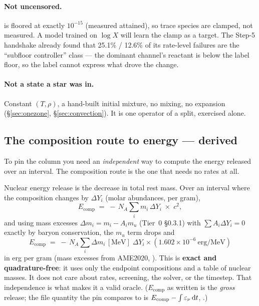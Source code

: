 \paragraph{Not uncensored.}  is floored at exactly $10^{-15}$
(measured attained), so trace species are clamped, not measured. A model trained
on $\log X$ will learn the clamp as a target. The Step-5 handshake already found
that 25.1\% / 12.6\% of its rate-level failures are the ``subfloor controller''
class --- the dominant channel's reactant is below the label floor, so the label
cannot express what drove the change. 

\paragraph{Not a state a star was in.} Constant $(T, \rho)$, a hand-built
initial mixture, no mixing, no expansion (\S\ref{sec:onezone},
\S\ref{sec:convection}). It is one operator of a split, exercised alone.

\subsection{The composition route to energy --- derived}
\label{sec:compositionroute}

To pin the  column you need an \emph{independent} way to compute
the energy released over an interval. The composition route is the one that
needs no rates at all.

Nuclear energy release is the decrease in total rest mass. Over an interval
where the composition changes by $\Delta Y_i$ (molar abundances, per gram),
%
\begin{equation}\label{eq:ecomp-restmass}
E_{\mathrm{comp}} \;=\; -\,N_A \sum_i m_i\,\Delta Y_i \;\times\; c^2 ,
\end{equation}
%
and using mass excesses $\Delta m_i = m_i - A_i m_u$ (Tier~0 \S 0.3.1) with
$\sum A_i \Delta Y_i = 0$ exactly by baryon conservation, the $m_u$ term drops
and
%
\begin{equation}\label{eq:ecomp}
\boxed{\;E_{\mathrm{comp}} \;=\; -\,N_A \sum_i \Delta m_i\,[\mathrm{MeV}]\;\Delta Y_i \times (1.602\times10^{-6}\ \mathrm{erg/MeV})\;}
\end{equation}
%
in erg per gram (mass excesses from AME2020, \citealt{wang2021}).
\derivedhere{} This is \textbf{exact and quadrature-free}: it uses only the
endpoint compositions and a table of nuclear masses. It does not care about
rates, screening, the solver, or the timestep. That independence is what makes
it a valid oracle. ($E_{\mathrm{comp}}$ as written is the \emph{gross} release;
the file quantity the pin compares to is $E_{\mathrm{comp}} - \int \varepsilon_{\nu}\,\mathrm{d} t$,
.)

